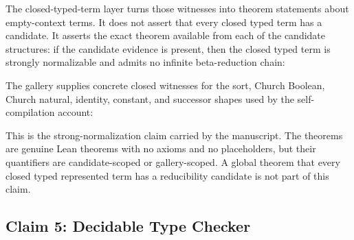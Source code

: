 The closed-typed-term layer turns those witnesses into theorem statements
about empty-context terms.  It does not assert that every closed typed term
has a candidate.  It asserts the exact theorem available from each of the
candidate structures: if the candidate evidence is present, then the closed
typed term is strongly normalizable and admits no infinite beta-reduction
chain:


The gallery supplies concrete closed witnesses for the sort, Church Boolean,
Church natural, identity, constant, and successor shapes used by the
self-compilation account:


This is the strong-normalization claim carried by the manuscript.  The
theorems are genuine Lean theorems with no axioms and no placeholders, but
their quantifiers are candidate-scoped or gallery-scoped.  A global theorem
that every closed typed represented term has a reducibility candidate is not
part of this claim.

\subsection{Claim 5: Decidable Type Checker}
\label{subsec:claim-decidable-type-checker}

